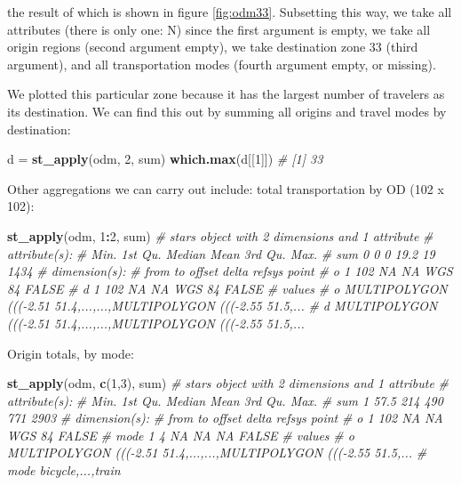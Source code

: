 \documentclass[]{book}
\newenvironment{Shaded}{\begin{snugshade}}{\end{snugshade}}
\newcommand{\CommentTok}[1]{\textcolor[rgb]{0.56,0.35,0.01}{\textit{#1}}}
\newcommand{\DecValTok}[1]{\textcolor[rgb]{0.00,0.00,0.81}{#1}}
\newcommand{\KeywordTok}[1]{\textcolor[rgb]{0.13,0.29,0.53}{\textbf{#1}}}
\newcommand{\NormalTok}[1]{#1}
\newcommand{\OperatorTok}[1]{\textcolor[rgb]{0.81,0.36,0.00}{\textbf{#1}}}
\newcommand{\StringTok}[1]{\textcolor[rgb]{0.31,0.60,0.02}{#1}}
\begin{document}
the result of which is shown in figure \ref{fig:odm33}.
Subsetting this way, we take all attributes (there is only one: N)
since the first argument is empty, we take all origin regions (second
argument empty), we take destination zone 33 (third argument),
and all transportation modes (fourth argument empty, or missing).

We plotted this particular zone because it has the largest number of travelers
as its destination. We can find this out by summing all origins and
travel modes by destination:

\begin{Shaded}
\begin{Highlighting}[]
\NormalTok{d =}\StringTok{ }\KeywordTok{st_apply}\NormalTok{(odm, }\DecValTok{2}\NormalTok{, sum)}
\KeywordTok{which.max}\NormalTok{(d[[}\DecValTok{1}\NormalTok{]])}
\CommentTok{# [1] 33}
\end{Highlighting}
\end{Shaded}

Other aggregations we can carry out include: total transportation
by OD (102 x 102):

\begin{Shaded}
\begin{Highlighting}[]
\KeywordTok{st_apply}\NormalTok{(odm, }\DecValTok{1}\OperatorTok{:}\DecValTok{2}\NormalTok{, sum)}
\CommentTok{# stars object with 2 dimensions and 1 attribute}
\CommentTok{# attribute(s):}
\CommentTok{#      Min. 1st Qu. Median Mean 3rd Qu. Max.}
\CommentTok{# sum     0       0      0 19.2      19 1434}
\CommentTok{# dimension(s):}
\CommentTok{#   from  to offset delta refsys point}
\CommentTok{# o    1 102     NA    NA WGS 84 FALSE}
\CommentTok{# d    1 102     NA    NA WGS 84 FALSE}
\CommentTok{#                                                              values}
\CommentTok{# o MULTIPOLYGON (((-2.51 51.4,...,...,MULTIPOLYGON (((-2.55 51.5,...}
\CommentTok{# d MULTIPOLYGON (((-2.51 51.4,...,...,MULTIPOLYGON (((-2.55 51.5,...}
\end{Highlighting}
\end{Shaded}

Origin totals, by mode:

\begin{Shaded}
\begin{Highlighting}[]
\KeywordTok{st_apply}\NormalTok{(odm, }\KeywordTok{c}\NormalTok{(}\DecValTok{1}\NormalTok{,}\DecValTok{3}\NormalTok{), sum)}
\CommentTok{# stars object with 2 dimensions and 1 attribute}
\CommentTok{# attribute(s):}
\CommentTok{#      Min. 1st Qu. Median Mean 3rd Qu. Max.}
\CommentTok{# sum     1    57.5    214  490     771 2903}
\CommentTok{# dimension(s):}
\CommentTok{#      from  to offset delta refsys point}
\CommentTok{# o       1 102     NA    NA WGS 84 FALSE}
\CommentTok{# mode    1   4     NA    NA     NA FALSE}
\CommentTok{#                                                                 values}
\CommentTok{# o    MULTIPOLYGON (((-2.51 51.4,...,...,MULTIPOLYGON (((-2.55 51.5,...}
\CommentTok{# mode                                                 bicycle,...,train}
\end{Highlighting}
\end{Shaded}
\end{document}
